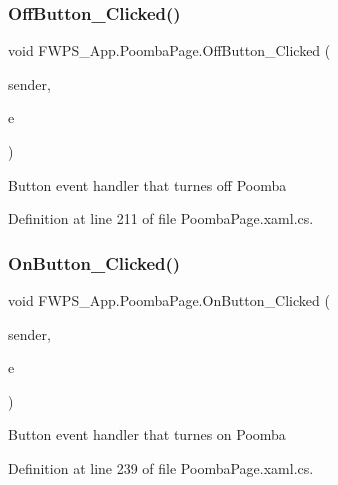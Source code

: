 \subsubsection{\texorpdfstring{Off\+Button\+\_\+\+Clicked()}{OffButton\_Clicked()}}
{\footnotesize\ttfamily void F\+W\+P\+S\+\_\+\+App.\+Poomba\+Page.\+Off\+Button\+\_\+\+Clicked (\begin{DoxyParamCaption}\item[{object}]{sender,  }\item[{Event\+Args}]{e }\end{DoxyParamCaption})\hspace{0.3cm}{\ttfamily [private]}}

Button event handler that turnes off Poomba 

Definition at line 211 of file Poomba\+Page.\+xaml.\+cs.

\mbox{\label{class_f_w_p_s___app_1_1_poomba_page_a83cd427dfa67807e60dc65216680faf7}} 
\subsubsection{\texorpdfstring{On\+Button\+\_\+\+Clicked()}{OnButton\_Clicked()}}
{\footnotesize\ttfamily void F\+W\+P\+S\+\_\+\+App.\+Poomba\+Page.\+On\+Button\+\_\+\+Clicked (\begin{DoxyParamCaption}\item[{object}]{sender,  }\item[{Event\+Args}]{e }\end{DoxyParamCaption})\hspace{0.3cm}{\ttfamily [private]}}

Button event handler that turnes on Poomba 

Definition at line 239 of file Poomba\+Page.\+xaml.\+cs.

\mbox{\label{class_f_w_p_s___app_1_1_poomba_page_a966462c53c6b6e627d8a92a38076c3a9}} 
